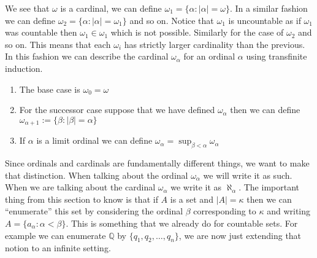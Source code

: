 We see that $\omega$ is a cardinal, we can define $\omega_1 = \{\alpha:
|\alpha| = \omega\}$. In a similar fashion we can define $\omega_{2}
= \{\alpha: |\alpha| = \omega_{1}\}$ and so on. Notice that $\omega_1$ is
uncountable as if $\omega_1$ was countable then $\omega_1 \in \omega_1$ which
is not possible. Similarly for the case of $\omega_2$ and so on. This means
that each $\omega_{i}$ has strictly larger cardinality than the previous. In
this fashion we can describe the cardinal $\omega_{\alpha}$ for an ordinal
$\alpha$ using transfinite induction.
\begin{enumerate}
  \item The base case is $\omega_0 = \omega$
  \item For the successor case suppose that we have defined $\omega_{\alpha}$ 
    then we can define $\omega_{\alpha + 1} := \{\beta: |\beta| = \alpha\} $
  \item If $\alpha$ is a limit ordinal we can define $\omega_{\alpha}
    = \sup_{\beta < \alpha} \omega_{\alpha}$
\end{enumerate}
Since ordinals and cardinals are fundamentally different things, we want to make that
distinction. When talking about the ordinal $\omega_{\alpha}$ we will write it
as such. When we are talking about the cardinal $\omega_{\alpha}$ we write it
as $\aleph_{\alpha}$. The important thing from this section to know is that if
$A$ is a set and $|A| = \kappa$ then we can ``enumerate'' this set by
considering the ordinal $\beta$ corresponding to $\kappa$ and writing $A
= \{a_{\alpha}: \alpha < \beta\}$. This is something that we already do for
countable sets. For example we can enumerate $\mathbb{Q}$ by $\{q_1, q_2,
\ldots, q_{n}\}$, we are now just extending that notion to an infinite setting.
